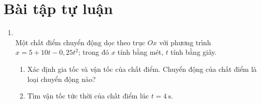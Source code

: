 \section{Bài tập tự luận}
\begin{enumerate}[label=\bfseries Bài \arabic*:,leftmargin=1.5cm]
\item {}\\
Một chất điểm chuyển động dọc theo trục $Ox$ với phương trình $x=5+10t-0,25t^2$; trong đó $x$ tính bằng mét, $t$ tính bằng giây.
\begin{enumerate}
	\item Xác định gia tốc và vận tốc của chất điểm. Chuyển động của chất điểm là loại chuyển động nào?
	\item Tìm vận tốc tức thời của chất điểm lúc $t=\SI{4}{\second}$.
\end{enumerate}


\end{enumerate}
